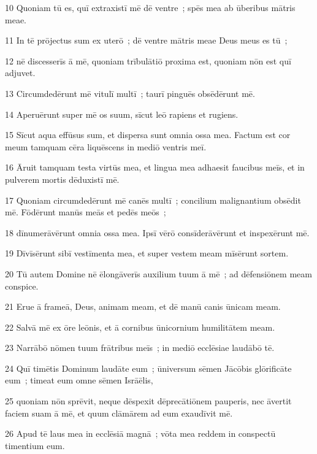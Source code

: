 \psalmVerse
  {\phantom{0}10}
  {Quoniam tū es, quī extraxistī mē dē ventre~; spēs mea ab ūberibus mātris meae.}


\psalmVerse
  {\phantom{0}11}
  {In tē prōjectus sum ex uterō~; dē ventre mātris meae Deus meus es tū~;}


\psalmVerse
  {\phantom{0}12}
  {nē discesserīs ā mē, quoniam trībulātiō proxima est, quoniam nōn est quī adjuvet.}


\psalmVerse
  {\phantom{0}13}
  {Circumdedērunt mē vitulī multī~; taurī pinguēs obsēdērunt mē.}


\psalmVerse
  {\phantom{0}14}
  {Aperuērunt super mē os suum, sīcut leō rapiens et rugiens.}


\psalmVerse
  {\phantom{0}15}
  {Sīcut aqua effūsus sum, et dispersa sunt omnia ossa mea. Factum est cor meum tamquam cēra liquēscens in mediō ventris meī.}


\psalmVerse
  {\phantom{0}16}
  {Āruit tamquam testa virtūs mea, et lingua mea adhaesit faucibus meīs, et in pulverem mortis dēduxistī mē.}


\psalmVerse
  {\phantom{0}17}
  {Quoniam circumdedērunt mē canēs multī~; concilium malignantium obsēdit mē. Fōdērunt manūs meās et pedēs meōs~;}


\psalmVerse
  {\phantom{0}18}
  {dīnumerāvērunt omnia ossa mea. Ipsī vērō consīderāvērunt et inspexērunt mē.}


\psalmVerse
  {\phantom{0}19}
  {Dīvīsērunt sibī vestīmenta mea, et super vestem meam mīsērunt sortem.}


\psalmVerse
  {\phantom{0}20}
  {Tū autem Domine nē ēlongāverīs auxilium tuum ā mē~; ad dēfensiōnem meam conspice.}


\psalmVerse
  {\phantom{0}21}
  {Erue ā frameā, Deus, animam meam, et dē manū canis ūnicam meam.}


\psalmVerse
  {\phantom{0}22}
  {Salvā mē ex ōre leōnis, et ā cornibus ūnicornium humilitātem meam.}


\psalmVerse
  {\phantom{0}23}
  {Narrābō nōmen tuum frātribus meīs~; in mediō ecclēsiae laudābō tē.}


\psalmVerse
  {\phantom{0}24}
  {Quī timētis Dominum laudāte eum~; ūniversum sēmen Jācōbis glōrificāte eum~; timeat eum omne sēmen Isrāēlis,}


\psalmVerse
  {\phantom{0}25}
  {quoniam nōn sprēvit, neque dēspexit dēprecātiōnem pauperis, nec āvertit faciem suam ā mē, et quum clāmārem ad eum exaudīvit mē.}


\psalmVerse
  {\phantom{0}26}
  {Apud tē laus mea in ecclēsiā magnā~; vōta mea reddem in conspectū timentium eum.}


